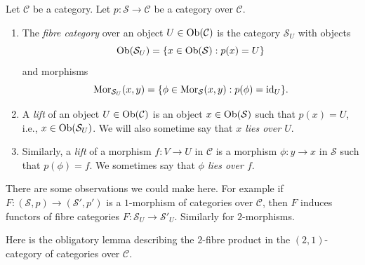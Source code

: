 \begin{definition}
\label{definition-fibre-category}
Let $\mathcal{C}$ be a category.
Let $p : \mathcal{S} \to \mathcal{C}$ be a category over $\mathcal{C}$.
\begin{enumerate}
\item The {\it fibre category} over an object $U\in \mathop{\mathrm{Ob}}\nolimits(\mathcal{C})$
is the category $\mathcal{S}_U$ with objects
$$
\mathop{\mathrm{Ob}}\nolimits(\mathcal{S}_U) = \{x\in \mathop{\mathrm{Ob}}\nolimits(\mathcal{S}) :
p(x) = U\}
$$
and morphisms
$$
\mathop{\mathrm{Mor}}\nolimits_{\mathcal{S}_U}(x, y) = \{ \phi \in \mathop{\mathrm{Mor}}\nolimits_\mathcal{S}(x, y) :
p(\phi) = \text{id}_U\}.
$$
\item A {\it lift} of an object $U \in \mathop{\mathrm{Ob}}\nolimits(\mathcal{C})$
is an object $x\in \mathop{\mathrm{Ob}}\nolimits(\mathcal{S})$ such that $p(x) = U$, i.e.,
$x\in \mathop{\mathrm{Ob}}\nolimits(\mathcal{S}_U)$. We will also sometime say
that {\it $x$ lies over $U$}.
\item Similarly, a {\it lift} of a morphism $f : V \to U$ in $\mathcal{C}$
is a morphism $\phi : y \to x$ in $\mathcal{S}$ such that $p(\phi) = f$.
We sometimes say that {\it $\phi$ lies over $f$}.
\end{enumerate}
\end{definition}

\noindent
There are some observations we could make here. For example if
$F : (\mathcal{S}, p) \to (\mathcal{S}', p')$ is a $1$-morphism
of categories over $\mathcal{C}$, then $F$ induces functors
of fibre categories $F : \mathcal{S}_U \to \mathcal{S}'_U$.
Similarly for $2$-morphisms.

\medskip\noindent
Here is the obligatory lemma describing the $2$-fibre product in the
$(2, 1)$-category of categories over $\mathcal{C}$.

